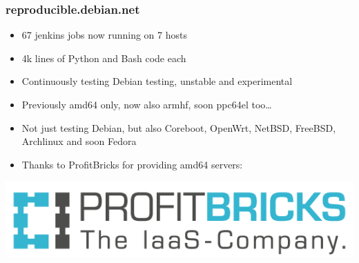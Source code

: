 \documentclass[14pt]{beamer}
\begin{document}
\begin{frame}
 \frametitle{reproducible.debian.net}

 \begin{itemize}
  \item 67 jenkins jobs now running on 7 hosts
  \item 4k lines of Python and Bash code each
  \item Continuously testing Debian testing, unstable and experimental
  \item Previously amd64 only, now also armhf, soon ppc64el too…
  \item Not just testing Debian, but also Coreboot, OpenWrt, NetBSD, FreeBSD,
  Archlinux and soon Fedora
  \item Thanks to ProfitBricks for providing amd64 servers:
 \end{itemize}
 \vfill
 \begin{center}
 \includegraphics[height=0.15\paperheight]{images/profitbricks_logo.png}
 \end{center}
\end{frame}
\end{document}
